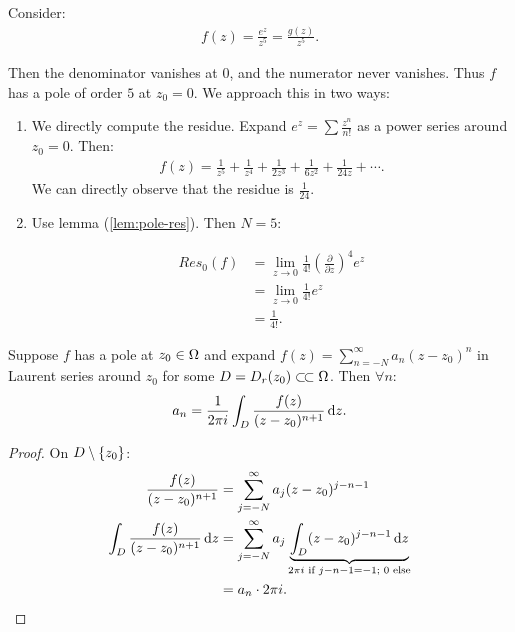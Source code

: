 \begin{example}
Consider:
\begin{align*}
    f(z) = \frac{e^z}{z^5} = \frac{g(z)}{z^5}.
\end{align*}

Then the denominator vanishes at $0$, and the numerator never vanishes. Thus $f$ has a pole of order $5$ at $z_0 = 0$. We approach this in two ways:
\begin{enumerate}
    \item We directly compute the residue. Expand $e^z = \sum \frac{z^n}{n!}$ as a power series around $z_0 = 0$. Then:
    \begin{align*}
        f(z) = \frac{1}{z^5} + \frac{1}{z^4} +\frac{1}{2z^3} + \frac{1}{6z^2} + \frac{1}{24z} + \cdots.
    \end{align*}
    We can directly observe that the residue is $\frac{1}{24}$.
    
    \item Use lemma (\ref{lem:pole-res}). Then $N=5$:
    
    \begin{align*}
        Res_{0}(f) &= \lim_{z \to 0} \frac{1}{4!} \left( \frac{\partial }{\partial z} \right)^4 e^z \\
        &= \lim_{z \to 0} \frac{1}{4!} e^z\\
        &= \frac{1}{4!}.
    \end{align*}
\end{enumerate}
\end{example}

\begin{lemma}\label{lem:res-lemma}
Suppose $f$ has a pole at $z_0 \in \Omega$ and expand $f(z) = \sum_{n=-N}^\infty a_n (z-z_0)^n$ in Laurent series around $z_0$ for some $D = D_r(z_0) \ssubset \om$. Then $\forall n$:
\begin{align*}
    a_n = \frac{1}{2 \pi i} \int_D \frac{f(z)}{(z-z_0)^{n+1}} \dif z.
\end{align*}
\end{lemma}

\begin{proof} On $D \setminus \{ z_0 \}$:
\begin{align*}
    \frac{f(z)}{(z-z_0)^{n+1}} &= \sum_{j=-N}^\infty a_j (z-z_0)^{j-n-1}\\
    \int_D \frac{f(z)}{(z-z_0)^{n+1}} \dif z &= \sum_{j=-N}^\infty a_j \underbrace{\int_D (z-z_0)^{j-n-1} \dif z}_{2\pi i \text{ if } j-n-1=-1;\text{ 0 else}}\\
    &= a_n \cdot 2 \pi i.
\end{align*}

\end{proof}

